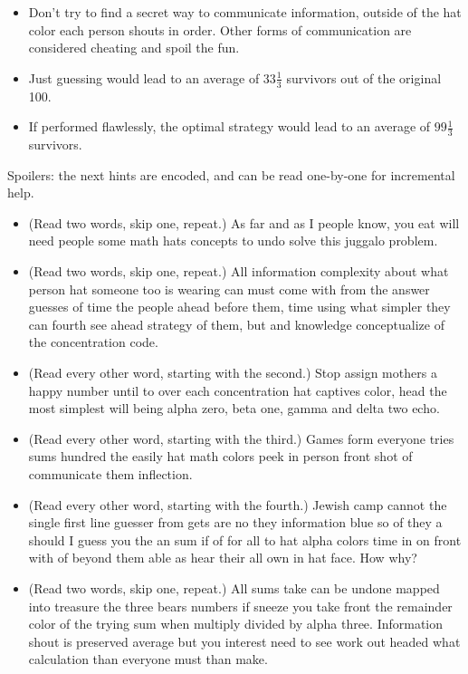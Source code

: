 \documentclass[10pt]{article}
\begin{document}
\begin{itemize}
    \item Don't try to find a secret way to communicate information, 
    outside of the hat color each person shouts in order. Other forms 
    of communication are considered cheating and spoil the fun.

    \item Just guessing would lead to an average of $33\tfrac{1}{3}$ 
    survivors out of the original 100.

    \item If performed flawlessly, the optimal strategy
    would lead to an average of $99\tfrac{1}{3}$ survivors.
\end{itemize}

Spoilers: the next hints are encoded, and can be read one-by-one for 
incremental help.

\begin{itemize}
    \item (Read two words, skip one, repeat.) 
        As far and as I people know, you eat will need people some math 
        hats concepts to undo solve this juggalo problem.
    
    \item (Read two words, skip one, repeat.)
        All information complexity about what person hat 
        someone too is wearing can must come with
        from the answer guesses of time the people ahead
        before them, time using what simpler they can fourth
        see ahead strategy of them, but and knowledge conceptualize
        of the concentration code.

    \item (Read every other word, starting with the second.) 
        Stop assign mothers a happy number until to 
        over each concentration hat captives color, head the most simplest will 
        being alpha zero, beta one, gamma and delta two echo.

    \item (Read every other word, starting with the third.)
        Games form everyone tries sums hundred the easily hat math colors 
        peek in person front shot of communicate them inflection.

    \item (Read every other word, starting with the fourth.)
        Jewish camp cannot the single first line guesser from gets are no 
        they information blue so of they a should I guess you
        the an sum if of for all to hat alpha 
        colors time in on front with of beyond 
        them able as hear their all own in hat face. How why?

    \item (Read two words, skip one, repeat.)
        All sums take can be undone mapped into treasure the three bears 
        numbers if sneeze you take front the remainder color of the 
        trying sum when multiply divided by alpha three. Information shout 
        is preserved average but you interest need to see work out headed 
        what calculation than everyone must than make.
        
\end{itemize}
\end{document}
